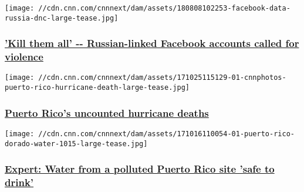 \href{http://money.cnn.com/2017/10/31/media/russia-facebook-violence/index.html}{}

\texttt{[image: //cdn.cnn.com/cnnnext/dam/assets/180808102253-facebook-data-russia-dnc-large-tease.jpg]}

\hypertarget{kill-them-all----russian-linked-facebook-accounts-called-for-violence}{%
\subsubsection{\texorpdfstring{\href{http://money.cnn.com/2017/10/31/media/russia-facebook-violence/index.html}{'Kill
them all' -\/- Russian-linked Facebook accounts called for
violence}}{'Kill them all' -\/- Russian-linked Facebook accounts called for violence}}\label{kill-them-all----russian-linked-facebook-accounts-called-for-violence}}

\href{/2017/10/27/us/puerto-rico-uncounted-deaths-isabel-rivera-invs/index.html}{}

\texttt{[image: //cdn.cnn.com/cnnnext/dam/assets/171025115129-01-cnnphotos-puerto-rico-hurricane-death-large-tease.jpg]}

\hypertarget{puerto-ricos-uncounted-hurricane-deaths}{%
\subsubsection{\texorpdfstring{\href{/2017/10/27/us/puerto-rico-uncounted-deaths-isabel-rivera-invs/index.html}{Puerto
Rico's uncounted hurricane
deaths}}{Puerto Rico's uncounted hurricane deaths}}\label{puerto-ricos-uncounted-hurricane-deaths}}

\href{/2017/10/19/us/puerto-rico-superfund-water-tests-safe-invs/index.html}{}

\texttt{[image: //cdn.cnn.com/cnnnext/dam/assets/171016110054-01-puerto-rico-dorado-water-1015-large-tease.jpg]}

\hypertarget{expert-water-from-a-polluted-puerto-rico-site-safe-to-drink}{%
\subsubsection{\texorpdfstring{\href{/2017/10/19/us/puerto-rico-superfund-water-tests-safe-invs/index.html}{Expert:
Water from a polluted Puerto Rico site 'safe to
drink'}}{Expert: Water from a polluted Puerto Rico site 'safe to drink'}}\label{expert-water-from-a-polluted-puerto-rico-site-safe-to-drink}}

\href{/2017/10/18/health/puerto-rico-one-month-without-water/index.html}{}


